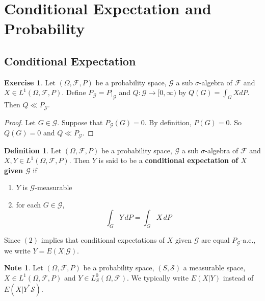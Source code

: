 \documentclass[12pt]{amsart}
\theoremstyle{definition}
\newtheorem{defn}[definition]{Definition}
\newtheorem{note}[definition]{Note}
\newtheorem{ex}[definition]{Exercise}
\newcommand{\sig}{\sigma}
\newcommand{\Om}{\Omega}
\newcommand{\MF}{\mathcal{F}}
\newcommand{\MG}{\mathcal{G}}
\newcommand{\MS}{\mathcal{S}}
\newcommand{\dP}{\, d P}
\begin{document}
	
	
	
	
	
	
	
	
	
	
	
	
	
	
	
	
	
	
	
	\newpage
	\section{Conditional Expectation and Probability}
	
	\subsection{Conditional Expectation}
	
	\begin{ex}
		Let $(\Om, \MF, P)$ be a probability space, $\MG$ a sub $\sig$-algebra of $\MF$ and $X \in L^1(\Om, \MF, P)$. Define $P_{\MG} = P|_{\MG}$ and $Q: \MG \rightarrow [0,\infty)$ by $Q(G) = \int_G X d P $. Then $Q \ll P_{\MG}$. 
	\end{ex}	
	
	\begin{proof}
		Let $G \in \MG$. Suppose that $P_{\MG}(G) = 0$. By definition, $P(G) = 0$. So $Q(G) = 0$ and $Q \ll P_{\MG}$.
	\end{proof}
	
	\begin{defn} 
	Let $(\Om, \MF, P)$ be a probability space, $\MG$ a sub $\sig$-algebra of $\MF$ and $X, Y \in L^1(\Om, \MF, P)$. Then $Y $ is said to be a \textbf{conditional expectation of $X$ given $\MG$} if 
	\begin{enumerate}
	\item $Y$ is $\MG$-measurable
	\item for each $G \in \MG$, 
	$$\int_G Y \dP = \int_G X \dP$$ 
	\end{enumerate}	 
	Since $(2)$ implies that conditional expectations of $X$ given $\MG$ are equal $P_{\MG}$-a.e., we write $Y = E(X|\MG)$.
	\end{defn}		

	\begin{note}
		Let $(\Om, \MF, P)$ be a probability space, $(S, \MS)$ a measurable space, $X \in L^1(\Om, \MF, P)$ and $Y \in L^0_S(\Om, \MF)$. We typically write $E(X|Y)$ instead of $E(X| Y^*\MS)$.
	\end{note}
	
\end{document}
